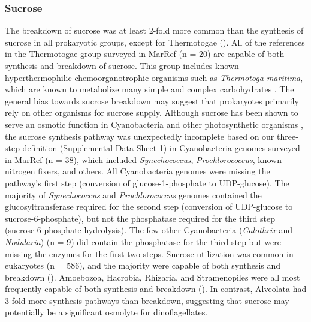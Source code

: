 \documentclass[utf8]{frontiersSCNS} %
\begin{document}
\subsubsection*{Sucrose}
The breakdown of sucrose was at least 2-fold more common than the synthesis of sucrose in all prokaryotic groups, except for Thermotogae (). All of the references in the Thermotogae group surveyed in MarRef (n = 20) are capable of both synthesis and breakdown of sucrose. This group includes known hyperthermophilic chemoorganotrophic organisms such as \emph{Thermotoga maritima}, which are known to metabolize many simple and complex carbohydrates \citep{NELSON2001169}. The general bias towards sucrose breakdown may suggest that prokaryotes primarily rely on other organisms for sucrose supply. Although sucrose has been shown to serve an osmotic function in Cyanobacteria and other photosynthetic organisms \citep{Reed1986,Klahn2011}, the sucrose synthesis pathway was unexpectedly incomplete based on our three-step definition (Supplemental Data Sheet 1) in Cyanobacteria genomes surveyed in MarRef (n = 38), which included \emph{Synechococcus}, \emph{Prochlorococcus}, known nitrogen fixers, and others. All Cyanobacteria genomes were missing the pathway's first step (conversion of glucose-1-phosphate to UDP-glucose). The majority of \emph{Synechococcus} and \emph{Prochlorococcus} genomes contained the glucosyltransferase required for the second step (conversion of UDP-glucose to sucrose-6-phosphate), but not the phosphatase required for the third step (sucrose-6-phosphate hydrolysis). The few other Cyanobacteria (\emph{Calothrix} and \emph{Nodularia}) (n = 9) did contain the phosphatase for the third step but were missing the enzymes for the first two steps. Sucrose utilization was common in eukaryotes (n = 586), and the majority were capable of both synthesis and breakdown (). Amoebozoa, Hacrobia, Rhizaria, and Stramenopiles were all most frequently capable of both synthesis and breakdown (). In contrast, Alveolata had 3-fold more synthesis pathways than breakdown, suggesting that sucrose may potentially be a  significant osmolyte for dinoflagellates. 
\end{document}
